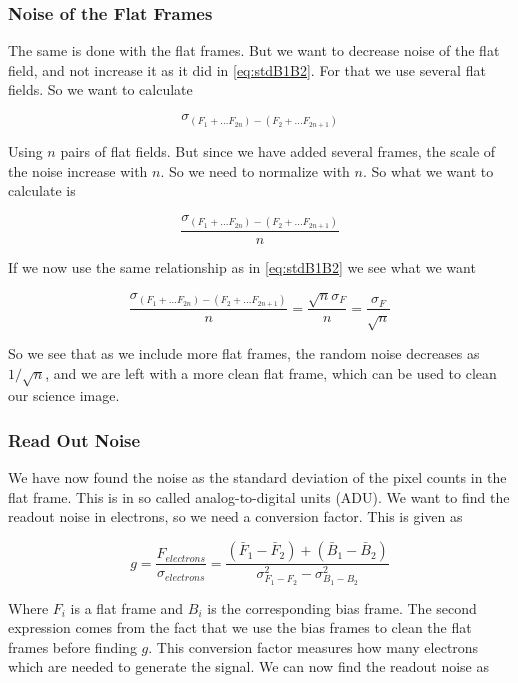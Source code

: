 \documentclass{emulateapj}
\begin{document}
\subsubsection{Noise of the Flat Frames}
\label{sec:noiseFlat}
The same is done with the flat frames. But we want to decrease noise of the flat field, and not increase it as it did in \eqref{eq:stdB1B2}. For that we use several flat fields. So we want to calculate

\begin{equation}
\sigma_{(F_1 + \ldots F_{2n})- (F_2 + \ldots F_{2n+1})}
\end{equation}

Using $n$ pairs of flat fields. But since we have added several frames, the scale of the noise increase with $n$. So we need to normalize with $n$. So what we want to calculate is

\begin{equation}
\frac{\sigma_{(F_1 + \ldots F_{2n})- (F_2 + \ldots F_{2n+1})}}{n}
\end{equation}

If we now use the same relationship as in \eqref{eq:stdB1B2} we see what we want

\begin{equation}
\frac{\sigma_{(F_1 + \ldots F_{2n})- (F_2 + \ldots F_{2n+1})}}{n} = \frac{\sqrt{n}\sigma_F}{n} = \frac{\sigma_F}{\sqrt{n}}
\end{equation}

So we see that as we include more flat frames, the random noise decreases as $1/\sqrt{n}$, and we are left with a more clean flat frame, which can be used to clean our science image.

\subsubsection{Read Out Noise}

We have now found the noise as the standard deviation of the pixel counts in the flat frame. This is in so called analog-to-digital units (ADU). We want to find the readout noise in electrons, so we need a conversion factor. This is given as

\begin{equation}
g = \frac{F_{electrons}}{\sigma_{electrons}} = \frac{(\bar{F}_1 - \bar{F}_2) + (\bar{B}_1-\bar{B}_2)}{\sigma_{F_1 - F_2}^2 - \sigma_{B_1 - B_2}^2}
\label{eq:g}
\end{equation}

Where $F_i$ is a flat frame and $B_i$ is the corresponding bias frame. The second expression comes from the fact that we use the bias frames to clean the flat frames before finding $g$. This conversion factor measures how many electrons which are needed to generate the signal. We can now find the readout noise as
\end{document}
